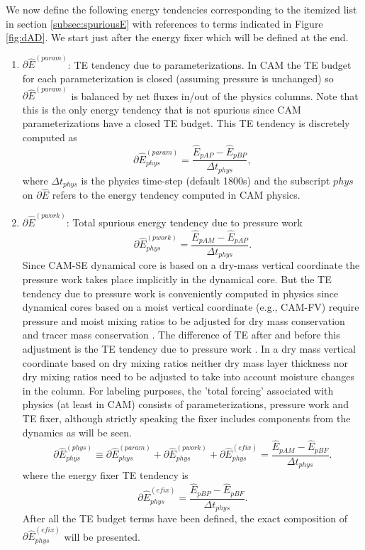 \documentclass[draft,linenumbers]{agujournal}
\newcommand*{\gi}[1]{\widehat{#1}}
\begin{document}
We now define the following energy tendencies corresponding to the itemized list in section \ref{subsec:spuriousE} with references to terms indicated in Figure \ref{fig:dAD}. We start just after the energy fixer which will be defined at the end.
\begin{enumerate}
%
\item $\partial \gi{E}^{(param)}$: TE tendency due to parameterizations. In CAM the TE budget for each parameterization is closed (assuming pressure is unchanged) so $\partial \gi{E}^{(param)}$ is balanced by net fluxes in/out of the physics columns. Note that this is the only energy tendency that is not spurious since CAM parameterizations have a closed TE budget. This TE tendency is discretely computed as
\begin{equation}
\partial \gi{E}_{phys}^{({param})}=\frac{\gi{E}_{pAP}-\gi{E}_{pBP}}{\Delta t_{phys}},
\end{equation}
where $\Delta t_{phys}$ is the physics time-step (default 1800s) and the subscript $phys$ on $\partial \gi{E}$ refers to the energy tendency computed in CAM physics. 
%
\item $\partial \gi{E}^{({pwork})}$: Total spurious energy tendency due to pressure work {\color{red}{error}}
\begin{equation}
\partial \gi{E}_{phys}^{({pwork})}=\frac{\gi{E}_{pAM}-\gi{E}_{pAP}}{\Delta t_{phys}}.
\end{equation}
Since CAM-SE dynamical core is based on a dry-mass vertical coordinate the pressure work {\color{red}{error}} takes place implicitly in the dynamical core. But the TE tendency due to pressure work {\color{red}{error}} is conveniently computed in physics since dynamical cores based on a moist vertical coordinate (e.g., CAM-FV) require pressure and moist mixing ratios to be adjusted for dry mass conservation and tracer mass conservation \citep[section 3.1.8 in ][]{CAM5}. The difference of TE after and before this adjustment is the TE tendency due to pressure work {\color{red}{error}}. In a dry mass vertical coordinate based on dry mixing ratios neither dry mass layer thickness nor dry mixing ratios need to be adjusted to take into account moisture changes in the column. For labeling purposes, the 'total forcing' associated with physics (at least in CAM) consists of parameterizations, pressure work {\color{red}{error}} and TE fixer, although strictly speaking the fixer includes components from the dynamics as will be seen.
\begin{equation}
\partial \gi{E}_{phys}^{({phys})}\equiv \partial \gi{E}_{phys}^{({param})}+\partial \gi{E}_{phys}^{({pwork})}+\partial \gi{E}_{phys}^{({efix})}=\frac{\gi{E}_{pAM}-\gi{E}_{pBF}}{\Delta t_{phys}}.
\end{equation}
where the energy fixer TE tendency is
\begin{equation}
\partial \gi{E}_{phys}^{({efix})}=\frac{\gi{E}_{pBP}-\gi{E}_{pBF}}{\Delta t_{phys}}.
\label{efix.def}
\end{equation}
After all the TE budget terms have been defined, the exact composition of $\partial \gi{E}_{phys}^{({efix})}$ will be presented.


\end{enumerate}
\end{document}
